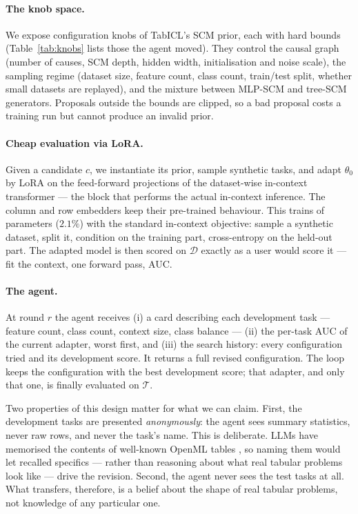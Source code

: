 \documentclass{article}
\begin{document}
\paragraph{The knob space.} We expose \Nknobs{} configuration knobs of TabICL's SCM prior,
each with hard bounds (Table~\ref{tab:knobs} lists those the agent moved). They control the
causal graph (number of causes, SCM depth, hidden width, initialisation and noise scale),
the sampling regime (dataset size, feature count, class count, train/test split, whether
small datasets are replayed), and the mixture between MLP-SCM and tree-SCM generators.
Proposals outside the bounds are clipped, so a bad proposal costs a training run but cannot
produce an invalid prior.

\paragraph{Cheap evaluation via LoRA.} Given a candidate $c$, we instantiate its prior,
sample synthetic tasks, and adapt $\theta_0$ by LoRA \cite{hu2022lora} on the feed-forward
projections of the dataset-wise in-context transformer --- the block that performs the
actual in-context inference. The column and row embedders keep their pre-trained behaviour.
This trains \LoRAParams{} of \TotalParams{} parameters ($2.1\%$) with the standard
in-context objective: sample a synthetic dataset, split it, condition on the training part,
cross-entropy on the held-out part. The adapted model is then scored on $\mathcal{D}$
exactly as a user would score it --- fit the context, one forward pass, AUC.

\paragraph{The agent.} At round $r$ the agent receives (i) a card describing each
development task --- feature count, class count, context size, class balance --- (ii) the
per-task AUC of the current adapter, worst first, and (iii) the search history: every
configuration tried and its development score. It returns a full revised configuration. The
loop keeps the configuration with the best development score; that adapter, and only that
one, is finally evaluated on $\mathcal{T}$.

Two properties of this design matter for what we can claim. First, the development tasks are
presented \emph{anonymously}: the agent sees summary statistics, never raw rows, and never
the task's name. This is deliberate. LLMs have memorised the contents of well-known OpenML
tables \cite{bordt2024elephants}, so naming them would let recalled specifics --- rather than
reasoning about what real tabular problems look like --- drive the revision. Second, the
agent never sees the test tasks at all. What transfers, therefore, is a belief about the
shape of real tabular problems, not knowledge of any particular one.
\end{document}
